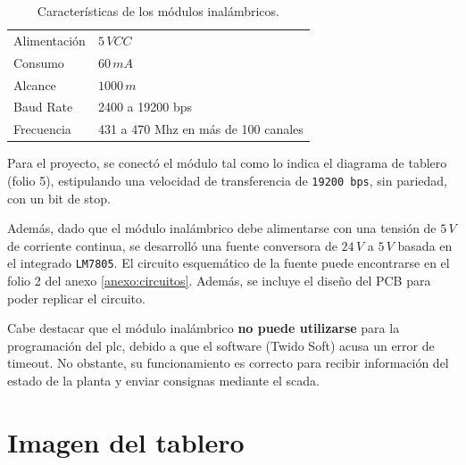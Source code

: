 \begin{table}[ht]
\renewcommand{\arraystretch}{1.3}
\centering
\begin{tabular}{|l|l|}
\hline
Alimentación & $5\,VCC$\\
Consumo& $60\,mA$\\
Alcance& $1000\,m$\\
Baud Rate &2400 a 19200 bps \\
Frecuencia& 431 a 470 Mhz en más de 100 canales\\
\hline
\end{tabular}
\caption{Características de los módulos inalámbricos.}
\label{tab:caractMod}
\end{table}

Para el proyecto, se conectó el módulo tal como lo indica el
diagrama de tablero (folio 5), estipulando una velocidad de transferencia de
\verb|19200 bps|, sin pariedad, con un bit de stop.

Además, dado que el módulo inalámbrico debe alimentarse con una tensión de
$5\,V$ de corriente continua, se desarrolló una fuente conversora de $24\,V$ a
$5\,V$ basada en el integrado \verb|LM7805|.
El circuito esquemático de la fuente puede encontrarse en el folio 2 del anexo
\ref{anexo:circuitos}.
Además, se incluye el diseño del PCB para poder replicar el circuito.

Cabe destacar que el módulo inalámbrico \textbf{no puede utilizarse} para
la programación del \gls{plc}, debido a que el software (Twido Soft) acusa un
error de timeout.
No obstante, su funcionamiento es correcto para recibir información
del estado de la planta y enviar consignas mediante el \gls{scada}.

\section{Imagen del tablero}

